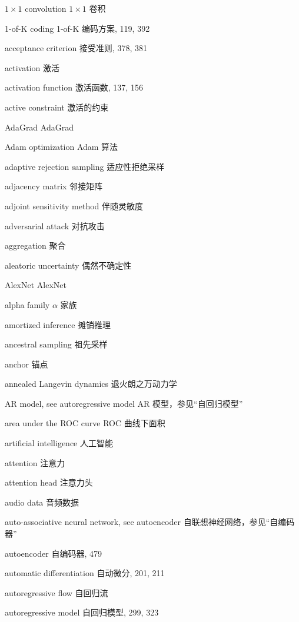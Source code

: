 $1 \times 1$ convolution $1 \times 1$ 卷积\par
1-of-K coding 1-of-K 编码方案, 119, 392\par
acceptance criterion 接受准则, 378, 381\par
activation 激活\par
activation function 激活函数, 137, 156\par
active constraint 激活的约束\par
AdaGrad AdaGrad\par
Adam optimization Adam 算法\par
adaptive rejection sampling 适应性拒绝采样\par
adjacency matrix 邻接矩阵\par
adjoint sensitivity method 伴随灵敏度\par
adversarial attack 对抗攻击\par
aggregation 聚合\par
aleatoric uncertainty 偶然不确定性\par
AlexNet AlexNet\par
alpha family $\alpha$ 家族\par
amortized inference 摊销推理\par
ancestral sampling 祖先采样\par
anchor 锚点\par
annealed Langevin dynamics 退火朗之万动力学\par
AR model, see autoregressive model AR 模型，参见“自回归模型”\par
area under the ROC curve ROC 曲线下面积\par
artificial intelligence 人工智能\par
attention 注意力\par
attention head 注意力头\par
audio data 音频数据\par
auto-associative neural network, see autoencoder 自联想神经网络，参见“自编码器”\par
autoencoder 自编码器, 479\par
automatic differentiation 自动微分, 201, 211\par
autoregressive flow 自回归流\par
autoregressive model 自回归模型, 299, 323\par
